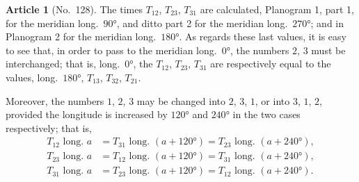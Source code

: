 \documentclass[11pt,a4paper]{article}
\theoremstyle{definition}
\newtheorem{art}{Article}
\begin{document}
\begin{art}[No.~128]
The times $T_{12}$, $T_{23}$, $T_{31}$ are calculated, Planogram 1, part 1, for the meridian long.~$90°$, and ditto part 2 for the meridian long.~$270°$; and in Planogram 2 for the meridian long.~$180°$. As regards these last values, it is easy to see that, in order to pass to the meridian long.~$0°$, the numbers $2$, $3$ must be interchanged; that is, long.~$0°$, the $T_{12}$, $T_{23}$, $T_{31}$ are respectively equal to the values, long.~$180°$, $T_{13}$, $T_{32}$, $T_{21}$.

Moreover, the numbers $1$, $2$, $3$ may be changed into $2$, $3$, $1$, or into $3$, $1$, $2$, provided the longitude is increased by $120°$ and $240°$ in the two cases respectively; that is,
\begin{align*}
T_{12} \text{ long. } a &= T_{31} \text{ long. } (a + 120°) = T_{23} \text{ long. } (a + 240°),\\
T_{23} \text{ long. } a &= T_{12} \text{ long. } (a + 120°) = T_{31} \text{ long. } (a + 240°),\\
T_{31} \text{ long. } a &= T_{23} \text{ long. } (a + 120°) = T_{12} \text{ long. } (a + 240°).
\end{align*}
\end{art}
\end{document}

